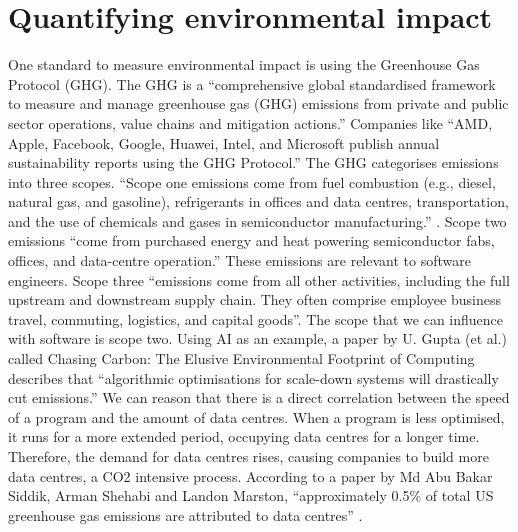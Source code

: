 \section{Quantifying environmental impact}
One standard to measure environmental impact is using the Greenhouse Gas Protocol (GHG). The GHG is a “comprehensive global standardised framework to measure and manage greenhouse gas (GHG) emissions from private and public sector operations, value chains and mitigation actions.” \cite{GHGProtocol} Companies like “AMD, Apple, Facebook, Google, Huawei, Intel, and Microsoft publish annual sustainability reports using the GHG Protocol.”\cite[p.855]{9407142}  The GHG categorises emissions into three scopes. “Scope one emissions come from fuel combustion (e.g., diesel, natural gas, and gasoline), refrigerants in offices and data centres, transportation, and the use of chemicals and gases in semiconductor manufacturing.” \cite[p.856]{9407142}. Scope two emissions “come from purchased energy and heat powering semiconductor fabs, offices, and data-centre operation.” \cite[p.856]{9407142} These emissions are relevant to software engineers. Scope three “emissions come from all other activities, including the full upstream and downstream supply chain. They often comprise employee business travel, commuting, logistics, and capital goods”. \cite[p.856]{9407142}
The scope that we can influence with software is scope two. Using AI as an example, a paper by U. Gupta (et al.) called Chasing Carbon: The Elusive Environmental Footprint of Computing describes that “algorithmic optimisations for scale-down systems will drastically cut emissions.” \cite[p.863]{9407142}
We can reason that there is a direct correlation between the speed of a program and the amount of data centres. When a program is less optimised, it runs for a more extended period, occupying data centres for a longer time. Therefore, the demand for data centres rises, causing companies to build more data centres, a CO2 intensive process. According to a paper by Md Abu Bakar Siddik, Arman Shehabi and Landon Marston, “approximately 0.5\% of total US greenhouse gas emissions are attributed to data centres” \cite{Siddik_2021}.
